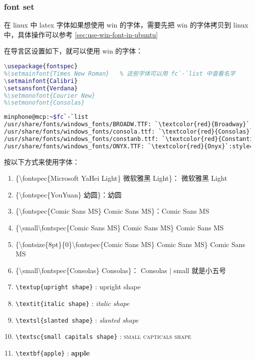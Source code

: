 
\subsubsection{font set}

在 linux 中 latex 字体如果想使用 win 的字体，需要先把 win 的字体拷贝到 linux 中，具体操作可以参考 
\ref{sec:use-win-font-in-ubuntu}

在导言区设置如下，就可以使用 win 的字体：
\begin{lstlisting}[language={matlab}]
\usepackage{fontspec}
%\setmainfont{Times New Roman}   % 这些字体可以用 fc`-`list 中查看名字
\setmainfont{Calibri}
\setsansfont{Verdana}
%\setmonofont{Courier New}
%\setmonofont{Consolas}
\end{lstlisting}

\begin{lstlisting}[language={sh}]
minphone@mcp:~$fc`-`list
/usr/share/fonts/windows_fonts/BROADW.TTF: `\textcolor{red}{Broadway}`:style=Regular,obyčejné
/usr/share/fonts/windows_fonts/consola.ttf: `\textcolor{red}{Consolas}`:style=Regular
/usr/share/fonts/windows_fonts/constanb.ttf: `\textcolor{red}{Constantia}`:style=Bold
/usr/share/fonts/windows_fonts/ONYX.TTF: `\textcolor{red}{Onyx}`:style=Regular,obyčejné
\end{lstlisting}

{\color{red}按以下方式来使用字体：}
\begin{enumerate}[topsep=0pt,itemsep=0pt,parsep=0pt,leftmargin=3.6em,label=\arabic*>]
    \item \{\textbackslash fontspec\{Microsoft YaHei Light\} 微软雅黑 Light\}：
        {微软雅黑 Light}  %
    \item \{\textbackslash fontspec\{YouYuan\} 幼圆\}：{幼圆}  %
    \item \{\textbackslash fontspec\{Comic Sans MS\} Comic Sans MS\}：{Comic Sans MS}  %
    \item \{\textbackslash small\textbackslash fontspec\{Comic Sans MS\} Comic Sans MS\}
        {\small{}Comic Sans MS}  %

    \item \{\textbackslash fontsize\{8pt\}\{0\}\textbackslash fontspec\{Comic Sans MS\} Comic Sans MS\}
        {\fontsize{8pt}{0}Comic Sans MS}  %

    \item \{\textbackslash small\textbackslash fontspec\{Consolas\} Consolas\}：
        {\small{}Consolas}  %
        | small {\color{teal}就是小五号}
    \item \verb=\textup{upright shape}= : \textup{upright shape}
    \item \verb=\textit{italic shape}= : \textit{italic shape}
    \item \verb=\textsl{slanted shape}= : \textsl{slanted shape}
    \item \verb=\textsc{small capitals shape}= : \textsc{small capticals shape}
    \item \verb=\textbf{apple}= : \textbf{apple}
\end{enumerate}

